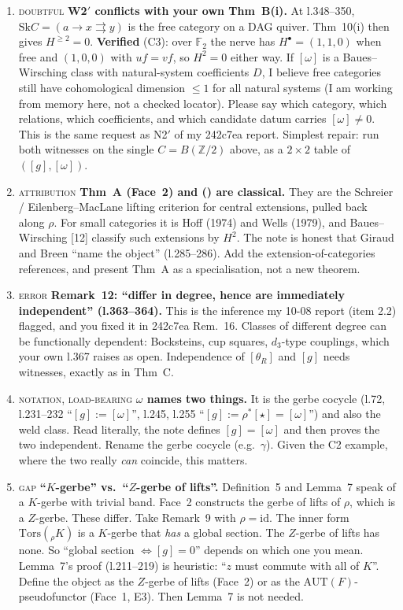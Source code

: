 \documentclass[11pt]{article}
\newcommand{\Z}{\mathbb{Z}}
\newcommand{\F}{\mathbb{F}}
\newcommand{\iss}[1]{\textsc{#1}}
\begin{document}
\begin{enumerate}[label=\textbf{E\arabic*},leftmargin=*]
\item \iss{doubtful} \textbf{W2$'$ conflicts with your own Thm~B(i).} At l.348--350,
$\mathrm{Sk}C=(a\to x\rightrightarrows y)$ is the free category on a DAG quiver. Thm~10(i) then
gives $H^{\ge2}=0$. \textbf{Verified} (C3): over $\F_2$ the nerve has $H^\bullet=(1,1,0)$ when free
and $(1,0,0)$ with $uf=vf$, so $H^2=0$ either way. If $[\omega]$ is a Baues--Wirsching class with
natural-system coefficients $D$, I believe free categories still have cohomological dimension
$\le1$ for all natural systems (I am working from memory here, not a checked locator). Please say
which category, which relations, which coefficients, and which candidate datum carries
$[\omega]\neq0$. This is the same request as N2$'$ of my 242c7ea report. Simplest repair: run both
witnesses on the single $C=B(\Z/2)$ above, as a $2\times2$ table of $([g],[\omega])$.

\item \iss{attribution} \textbf{Thm~A (Face~2) and (\textdagger) are classical.} They are the
Schreier / Eilenberg--MacLane lifting criterion for central extensions, pulled back along $\rho$.
For small categories it is Hoff (1974) and Wells (1979), and Baues--Wirsching [12] classify such
extensions by $H^2$. The note is honest that Giraud and Breen ``name the object'' (l.285--286).
Add the extension-of-categories references, and present Thm~A as a specialisation, not a new
theorem.

\item \iss{error} \textbf{Remark~12: ``differ in degree, hence are immediately independent''
(l.363--364).} This is the inference my 10-08 report (item 2.2) flagged, and you fixed it in
242c7ea Rem.~16. Classes of different degree can be functionally dependent: Bocksteins, cup
squares, $d_3$-type couplings, which your own l.367 raises as open. Independence of $[\theta_R]$
and $[g]$ needs witnesses, exactly as in Thm~C.

\item \iss{notation, load-bearing} \textbf{$\omega$ names two things.} It is the gerbe cocycle
(l.72, l.231--232 ``$[g]:=[\omega]$'', l.245, l.255 ``$[g]:=\rho^*[\star]=[\omega]$'') and also the
weld class. Read literally, the note defines $[g]=[\omega]$ and then proves the two independent.
Rename the gerbe cocycle (e.g.\ $\gamma$). Given the C2 example, where the two really \emph{can}
coincide, this matters.

\item \iss{gap} \textbf{``$K$-gerbe'' vs.\ ``$Z$-gerbe of lifts''.} Definition~5 and Lemma~7 speak
of a $K$-gerbe with trivial band. Face~2 constructs the gerbe of lifts of $\rho$, which is a
$Z$-gerbe. These differ. Take Remark~9 with $\rho=\mathrm{id}$. The inner form
$\mathrm{Tors}({}_\rho K)$ is a $K$-gerbe that \emph{has} a global section. The $Z$-gerbe of lifts
has none. So ``global section $\Leftrightarrow[g]=0$'' depends on which one you mean. Lemma~7's
proof (l.211--219) is heuristic: ``$z$ must commute with all of $K$''. Define the object as the
$Z$-gerbe of lifts (Face~2) or as the $\mathrm{AUT}(F)$-pseudofunctor (Face~1, E3). Then Lemma~7 is
not needed.
\end{enumerate}
\end{document}
